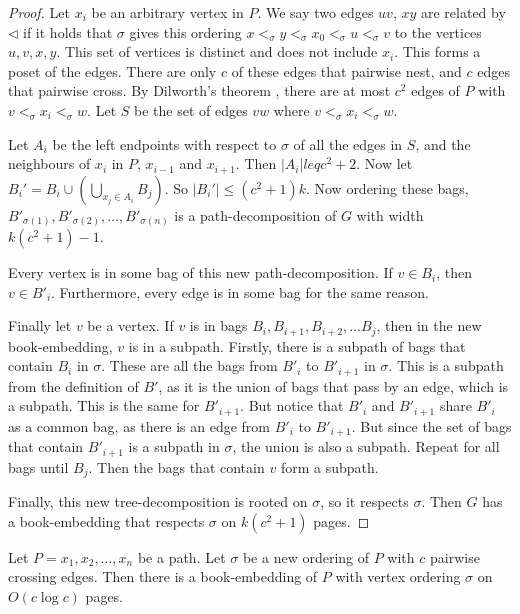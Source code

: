 \begin{proof}
    Let $x_i$ be an arbitrary vertex in $P$. We say two edges $uv$, $xy$ are related by $\lhd$ if it holds that $\sigma$ gives this ordering $x <_\sigma y <_\sigma x_0 <_\sigma u <_\sigma v$ to the vertices $u,v, x, y$. This set of vertices is distinct and does not include $x_i$. This forms a poset of the edges. There are only $c$ of these edges that pairwise nest, and $c$ edges that pairwise cross. By Dilworth's theorem \cite{dilworthDecompositionTheoremPartially1950}, there are at most $c^2$ edges of $P$ with $v <_\sigma x_i <_\sigma w$. Let $S$ be the set of edges $vw$ where $v <_\sigma x_i <_\sigma w$.

    Let $A_i$ be the left endpoints with respect to $\sigma$ of all the edges in $S$, and the neighbours of $x_i$ in $P$, $x_{i-1}$ and $x_{i + 1}$. Then $|A_i| leq c^2 + 2$. Now let $B_i' = B_i \cup \left(\bigcup_{x_j \in A_i} B_j\right)$. So $|B_i'| \leq (c^2 + 1) k$. Now ordering these bags, $B'_{\sigma(1)}, B'_{\sigma(2)}, \ldots, B'_{\sigma(n)}$ is a path-decomposition of $G$ with width $k (c^2 + 1)- 1$. 
    
    Every vertex is in some bag of this new path-decomposition. If $v \in B_i$, then $v \in B'_{i}$. Furthermore, every edge is in some bag for the same reason.

    Finally let $v$ be a vertex. If $v$ is in bags $B_{i},  B_{i + 1}, B_{i + 2}, \ldots B_j$, then in the new book-embedding, $v$ is in a subpath. Firstly, there is a subpath of bags that contain $B_i$ in $\sigma$. These are all the bags from $B'_{i}$ to $B'_{i + 1}$ in $\sigma$. This is a subpath from the definition of $B'$, as it is the union of bags that pass by an edge, which is a subpath. This is the same for $B'_{i + 1}$. But notice that $B'_i$ and $B'_{i + 1}$ share $B'_i$ as a common bag, as there is an edge from $B'_{i}$ to $B'_{i + 1}$. But since the set of bags that contain $B'_{i + 1}$ is a subpath in $\sigma$, the union is also a subpath. Repeat for all bags until $B_j$. Then the bags that contain $v$ form a subpath.

    Finally, this new tree-decomposition is rooted on $\sigma$, so it respects $\sigma$. Then $G$ has a book-embedding that respects $\sigma$ on $k(c^2 + 1)$ pages. 
\end{proof}

\begin{lemma}\label{lem:paths}
    Let $P = x_1, x_2, \ldots, x_n$ be a path. Let $\sigma$ be a new ordering of $P$ with $c$ pairwise crossing edges. Then there is a book-embedding of $P$ with vertex ordering $\sigma$ on $O(c \log c)$ pages.
\end{lemma}


